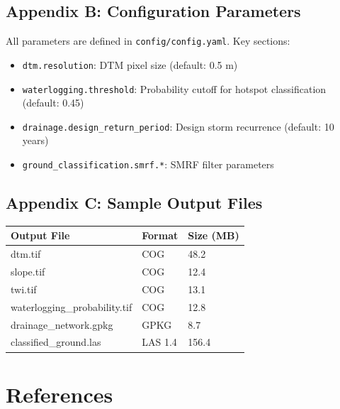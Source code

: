\documentclass[a4paper,12pt]{article}
\begin{document}
\subsection{Appendix B: Configuration Parameters}

All parameters are defined in \texttt{config/config.yaml}. Key sections:

\begin{itemize}
	\item \texttt{dtm.resolution}: DTM pixel size (default: 0.5 m)
	\item \texttt{waterlogging.threshold}: Probability cutoff for hotspot classification (default: 0.45)
	\item \texttt{drainage.design\_return\_period}: Design storm recurrence (default: 10 years)
	\item \texttt{ground\_classification.smrf.*}: SMRF filter parameters
\end{itemize}

\subsection{Appendix C: Sample Output Files}

\begin{longtable}{lll}
	\toprule
	\textbf{Output File}          & \textbf{Format} & \textbf{Size (MB)} \\
	\midrule
	dtm.tif                       & COG             & 48.2               \\
	slope.tif                     & COG             & 12.4               \\
	twi.tif                       & COG             & 13.1               \\
	waterlogging\_probability.tif & COG             & 12.8               \\
	drainage\_network.gpkg        & GPKG            & 8.7                \\
	classified\_ground.las        & LAS 1.4         & 156.4              \\
	\bottomrule
\end{longtable}

\newpage

\section{References}
\end{document}
